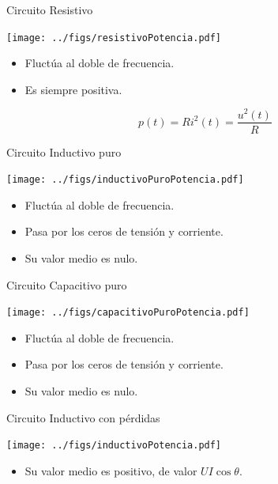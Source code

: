 \documentclass[xcolor={usenames,svgnames,dvipsnames}]{beamer}
\begin{document}
\begin{frame}[label={sec:org34a3657}]{Circuito Resistivo}
\begin{center}
\texttt{[image: ../figs/resistivoPotencia.pdf]}
\end{center}

\begin{itemize}
\item Fluctúa al doble de frecuencia.
\item Es siempre positiva.
\end{itemize}
\[
  p(t) = R i^2(t) = \frac{u^2(t)}{R}
\]
\end{frame}
\begin{frame}[label={sec:orgfaa38f6}]{Circuito Inductivo puro}
\begin{center}
\texttt{[image: ../figs/inductivoPuroPotencia.pdf]}
\end{center}

\begin{itemize}
\item Fluctúa al doble de frecuencia.
\item Pasa por los ceros de tensión y corriente.
\item Su valor medio es nulo.
\end{itemize}
\end{frame}


\begin{frame}[label={sec:org369e15d}]{Circuito Capacitivo puro}
\begin{center}
\texttt{[image: ../figs/capacitivoPuroPotencia.pdf]}
\end{center}

\begin{itemize}
\item Fluctúa al doble de frecuencia.
\item Pasa por los ceros de tensión y corriente.
\item Su valor medio es nulo.
\end{itemize}
\end{frame}

\begin{frame}[label={sec:org4aa48fa}]{Circuito Inductivo con pérdidas}
\begin{center}
\texttt{[image: ../figs/inductivoPotencia.pdf]}
\end{center}

\begin{itemize}
\item Su valor medio es positivo, de valor \(U I \cos \theta\).
\end{itemize}
\end{frame}
\end{document}
